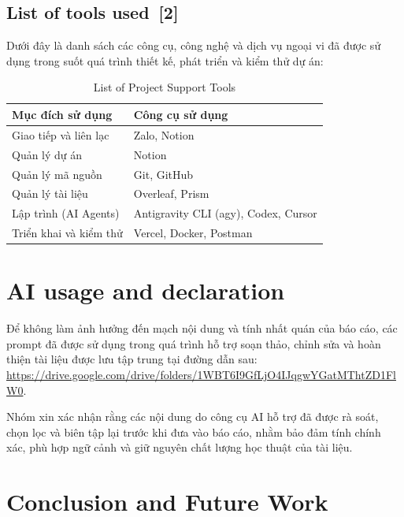 \documentclass[12pt, a4paper]{article}
\begin{document}
\subsection[List of tools used]{List of tools used \,{\normalfont\small\textcolor{cyan!70!black}{[2]}}}

Dưới đây là danh sách các công cụ, công nghệ và dịch vụ ngoại vi đã được sử dụng trong suốt quá trình thiết kế, phát triển và kiểm thử dự án:

\renewcommand{\arraystretch}{1.5}
\begin{table}[H]
    \centering
    \begin{tabularx}{\textwidth}{|l|X|}
    \hline
    \textbf{Mục đích sử dụng} & \textbf{Công cụ sử dụng} \\
    \hline
    Giao tiếp và liên lạc & Zalo, Notion \\
    \hline
    Quản lý dự án & Notion \\
    \hline
    Quản lý mã nguồn & Git, GitHub \\
    \hline
    Quản lý tài liệu & Overleaf, Prism \\
    
    \hline
    Lập trình (AI Agents) & Antigravity CLI (agy), Codex, Cursor \\
    \hline
    Triển khai và kiểm thử & Vercel, Docker, Postman \\
    \hline
    \end{tabularx}
    \caption{List of Project Support Tools}
\end{table}

\section{AI usage and declaration}

Để không làm ảnh hưởng đến mạch nội dung và tính nhất quán của báo cáo, các prompt đã được sử dụng trong quá trình hỗ trợ soạn thảo, chỉnh sửa và hoàn thiện tài liệu được lưu tập trung tại đường dẫn sau: \url{https://drive.google.com/drive/folders/1WBT6I9GfLjO4IJqgwYGatMThtZD1FlW0}.

Nhóm xin xác nhận rằng các nội dung do công cụ AI hỗ trợ đã được rà soát, chọn lọc và biên tập lại trước khi đưa vào báo cáo, nhằm bảo đảm tính chính xác, phù hợp ngữ cảnh và giữ nguyên chất lượng học thuật của tài liệu.

\section{Conclusion and Future Work}
\end{document}
